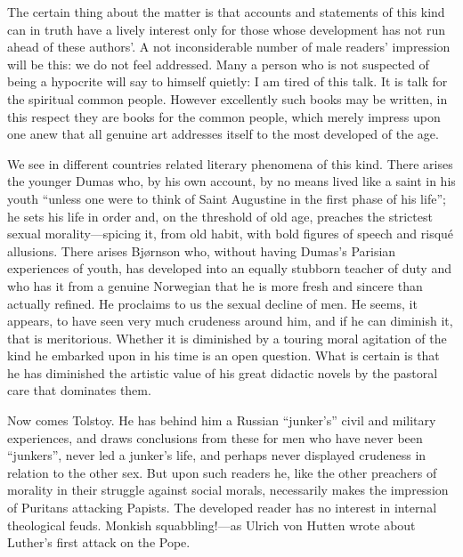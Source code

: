 \documentclass[12pt,a4paper]{article}
\begin{document}
The certain thing about the matter is that accounts and statements of
this kind can in truth have a lively interest only for those whose
development has not run ahead of these authors'. A not inconsiderable
number of male readers' impression will be this: we do not feel
addressed. Many a person who is not suspected of being a hypocrite will
say to himself quietly: I am tired of this talk. It is talk for the
spiritual common people. However excellently such books may be written,
in this respect they are books for the common people, which merely
impress upon one anew that all genuine art addresses itself to the most
developed of the age.

We see in different countries related literary phenomena of this kind.
There arises the younger Dumas who, by his own account, by no means
lived like a saint in his youth ``unless one were to think of Saint
Augustine in the first phase of his life''; he sets his life in order
and, on the threshold of old age, preaches the strictest sexual
morality---spicing it, from old habit, with bold figures of speech and
risqué allusions. There arises Bjørnson who, without having Dumas's
Parisian experiences of youth, has developed into an equally stubborn
teacher of duty and who has it from a genuine Norwegian that he is
more fresh and sincere than actually refined. He proclaims to us the
sexual decline of men. He seems, it appears, to have seen very much
crudeness around him, and if he can diminish it, that is meritorious.
Whether it is diminished by a touring moral agitation of the kind he
embarked upon in his time is an open question. What is certain is
that he has diminished the artistic value of his great didactic novels
by the pastoral care that dominates them.

Now comes Tolstoy. He has behind him a Russian ``junker's'' civil and
military experiences, and draws conclusions from these for men who
have never been ``junkers'', never led a junker's life, and perhaps
never displayed crudeness in relation to the other sex. But upon such
readers he, like the other preachers of morality in their struggle
against social morals, necessarily makes the impression of Puritans
attacking Papists. The developed reader has no interest in internal
theological feuds. Monkish squabbling!---as Ulrich von Hutten wrote
about Luther's first attack on the Pope.
\end{document}
